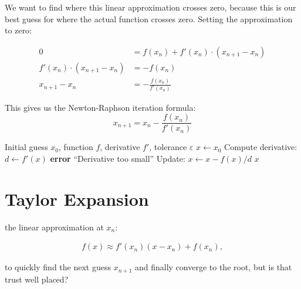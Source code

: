  We want to find where this linear approximation crosses zero, 
because this is our best guess for where the actual function crosses zero. Setting the approximation to zero:

\begin{align*}
    0 &= f(x_n) + f'(x_n) \cdot (x_{n+1} - x_n) \\
    f'(x_n) \cdot (x_{n+1} - x_n) &= -f(x_n) \\
    x_{n+1} - x_n &= -\frac{f(x_n)}{f'(x_n)}
\end{align*}

This gives us the Newton-Raphson iteration formula:
\begin{equation}
    x_{n+1} = x_n - \frac{f(x_n)}{f'(x_n)}
\end{equation}


\vspace{1.5em}
\begin{algorithm}[H]
\caption{Newton-Raphson Method}
\begin{algorithmic}[1]
    \Require Initial guess $x_0$, function $f$, derivative $f'$, tolerance $\varepsilon$
    \State $x \gets x_0$
        \State Compute derivative: $d \gets f'(x)$
            \State \textbf{error} ``Derivative too small''
        \EndIf
        \State Update: $x \gets x - f(x) / d$
    \EndWhile
    \Return $x$
\end{algorithmic}
\end{algorithm}






\section{Taylor Expansion}

 the linear approximation at $x_n$:

\begin{align}
    f(x) \approx f'(x_n)(x - x_n) + f(x_n),
\end{align}

to quickly find the next guess $x_{n+1}$ and finally converge to the root, but is that trust well placed?\\

